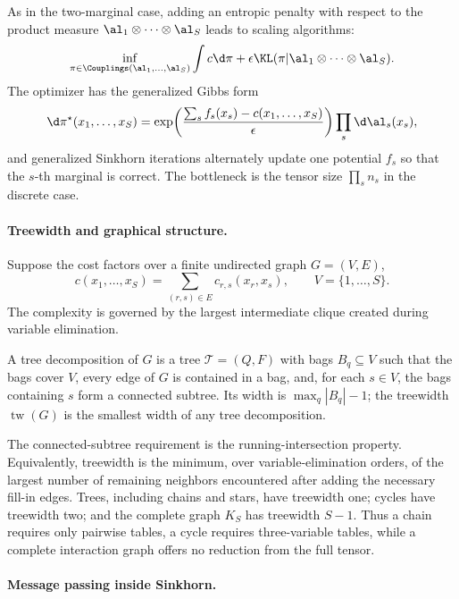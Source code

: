 As in the two-marginal case, adding an entropic penalty with respect to the product measure $\al_1\otimes\cdots\otimes\al_S$ leads to scaling algorithms:
\[
	\inf_{\pi\in\Couplings(\al_1,\ldots,\al_S)}
	\int c\d\pi+\epsilon\KL(\pi|\al_1\otimes\cdots\otimes\al_S).
\]
The optimizer has the generalized Gibbs form
\[
	\d\pi^\star(x_1,\ldots,x_S)
	=
	\exp\!\left(\frac{\sum_s f_s(x_s)-c(x_1,\ldots,x_S)}{\epsilon}\right)
	\prod_s\d\al_s(x_s),
\]
and generalized Sinkhorn iterations alternately update one potential $f_s$ so that the $s$-th marginal is correct. The bottleneck is the tensor size $\prod_s n_s$ in the discrete case.

\paragraph{Treewidth and graphical structure.}

Suppose the cost factors over a finite undirected graph $G=(V,E)$,
\begin{equation}\label{eq-multimarginal-graph-cost}
	c(x_1,\ldots,x_S)=\sum_{(r,s)\in E}c_{r,s}(x_r,x_s),
	\qquad V=\{1,\ldots,S\}.
\end{equation}
The complexity is governed by the largest intermediate clique created during variable elimination.

\begin{defn}\label{def-treewidth}
	A tree decomposition of $G$ is a tree $\mathcal T=(Q,F)$ with bags $B_q\subseteq V$ such that the bags cover $V$, every edge of $G$ is contained in a bag, and, for each $s\in V$, the bags containing $s$ form a connected subtree. Its width is $\max_q|B_q|-1$; the treewidth $\operatorname{tw}(G)$ is the smallest width of any tree decomposition.
\end{defn}

The connected-subtree requirement is the running-intersection property. Equivalently, treewidth is the minimum, over variable-elimination orders, of the largest number of remaining neighbors encountered after adding the necessary fill-in edges. Trees, including chains and stars, have treewidth one; cycles have treewidth two; and the complete graph $K_S$ has treewidth $S-1$. Thus a chain requires only pairwise tables, a cycle requires three-variable tables, while a complete interaction graph offers no reduction from the full tensor.

\paragraph{Message passing inside Sinkhorn.}

